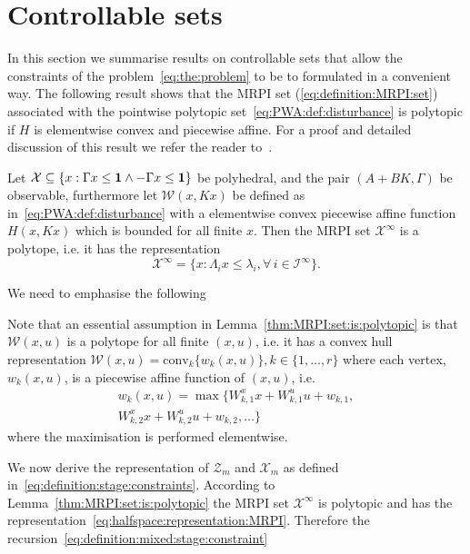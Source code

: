 \documentclass{ifacconf}
\providecommand{\conv}{\text{conv}}
\begin{document}
\section{Controllable sets}\label{sec:preliminaries}
In this section we summarise results on controllable sets that allow the constraints of the problem~\eqref{eq:the:problem} 
to be to formulated in a convenient way. The following result shows that the MRPI set (\ref{eq:definition:MRPI:set}) 
associated with the pointwise polytopic set~\eqref{eq:PWA:def:disturbance} is polytopic if $H$ is elementwise convex 
and piecewise affine. For a proof and detailed discussion of this result we refer the reader to~\cite{Schaich:2015}.
%
\begin{lem}\label{thm:MRPI:set:is:polytopic}
Let $\mathcal X \subseteq \{x:\Gamma x\leq{\bf{1}}\wedge-\Gamma x\leq{\bf{1}}\}$ be polyhedral, and the pair $(A+BK,\Gamma)$ be
observable, furthermore let $\mathcal W(x,Kx)$ be defined as in~\eqref{eq:PWA:def:disturbance} with a elementwise convex piecewise
affine function $H(x,Kx)$ which is bounded for all finite $x$. Then the MRPI set $\mathcal X^\infty$ is a polytope, i.e.
it has the representation 
\begin{equation}\label{eq:halfspace:representation:MRPI}
	\mathcal X^\infty=\{x:\Lambda_i x\leq \lambda_i, \forall\, i\in\mathcal I^\infty\}.
\end{equation}
\end{lem}
%
We need to emphasise the following 
\begin{rem}\label{rem:vertex:representation}
Note that an essential assumption in Lemma~\ref{thm:MRPI:set:is:polytopic} is that $\mathcal W(x,u)$ is a polytope
for all finite $(x,u)$, i.e. it has a convex hull representation $\mathcal W(x,u) = \conv_k\{w_k(x,u)\}, k\in\{1,\dots,r\}$ where each 
vertex, $w_k(x,u)$, is a piecewise affine function of $(x,u)$, i.e.
\begin{multline}
	w_k(x,u) = \max\{W_{k,1}^x x + W_{k,1}^u u + w_{k,1}, \\
        W_{k,2}^x x + W_{k,2}^u u + w_{k,2},\dots\}
\end{multline}
where the maximisation is performed elementwise.
\end{rem}
%
We now derive the representation of $\mathcal Z_m$ and $\mathcal X_m$ as defined in~\eqref{eq:definition:stage:constraints}.
According to Lemma~\ref{thm:MRPI:set:is:polytopic} the MRPI set $\mathcal X^\infty$ is polytopic and has the 
representation~\eqref{eq:halfspace:representation:MRPI}. Therefore the recursion~\eqref{eq:definition:mixed:stage:constraint}
\end{document}
